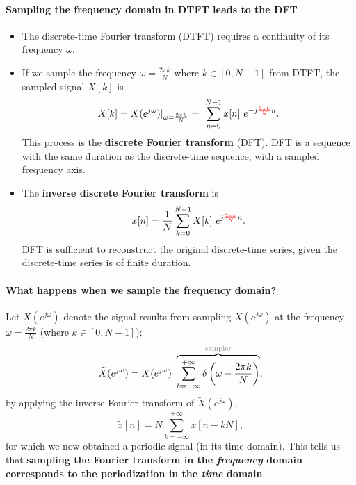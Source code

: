\paragraph{Sampling the frequency domain in DTFT leads to the DFT}
\begin{itemize}
    \item The discrete-time Fourier transform (DTFT) requires a continuity of its frequency $\omega$.

    \item If we sample the frequency $\displaystyle \omega = \frac{2\pi k}{N}$ where $k \in [0, N-1]$ from DTFT, the sampled signal $X[k]$ is
    \[
        X[k] = X(e^{j\omega})\lvert_{\omega = \frac{2\pi k}{N}} \ = \ \sum_{n=0}^{N-1} x[n] \ e^{-j {\color{red}\frac{2\pi k}{N}} n}.
    \]
    This process is the \textbf{discrete Fourier transform} (DFT). DFT is a sequence with the same duration as the discrete-time sequence, with a sampled frequency axis.

    \item The \textbf{inverse discrete Fourier transform} is
    \[
        x[n] = \frac{1}{N} \sum_{k=0}^{N-1} X[k] \ e^{{j \color{red}\frac{2\pi k}{N}} n}.
    \]
    DFT is sufficient to reconstruct the original discrete-time series, given the discrete-time series is of finite duration.
\end{itemize}

\paragraph{What happens when we sample the frequency domain?} Let $\widetilde{X}(e^{j\omega})$ denote the signal results from sampling $X(e^{j\omega})$ at the frequency $\displaystyle \omega = \frac{2\pi k}{N}$ (where $k \in [0, N-1]$):
\[
    \widetilde{X}(e^{j\omega}) = X(e^{j\omega})  \ \overbrace{\sum_{k=-\infty}^{+\infty} \delta \left(\omega-\frac{2\pi k}{N} \right)}^{\text{\color{gray} sampler}},
\]
by applying the inverse Fourier transform of $\widetilde{X}(e^{j\omega})$,
\[
    \widetilde{x}[n] = N \sum_{k=-\infty}^{+\infty} x[n-kN],
\]
for which we now obtained a periodic signal (in its time domain). This tells us that \textbf{sampling the Fourier transform in the \textit{frequency} domain corresponds to the periodization in the \textit{time} domain}.

